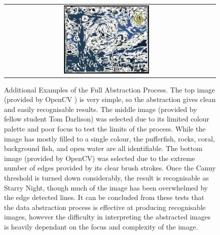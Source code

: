\begin{figure}[ht]
\begin{center}
\begin{tabular}{ c c }
        \includegraphics[width=0.43\textwidth]{Figures/starry_nightDA.jpg} 
    \end{tabular}
    \caption[Additional Examples of the Full Abstraction Process]{Additional Examples of the Full Abstraction Process. The top image (provided by OpenCV \cite{OpenCV}) is very simple, so the abstraction gives clean and easily recognisable results. The middle image (provided by fellow student Tom Darlison) was selected due to its limited colour palette and poor focus to test the limits of the process. While the image has mostly filled to a single colour, the pufferfish, rocks, coral, background fish, and open water are all identifiable. The bottom image (provided by OpenCV) was selected due to the extreme number of edges provided by its clear brush strokes. Once the Canny threshold is turned down considerably, the result is recognisable as Starry Night, though much of the image has been overwhelmed by the edge detected lines. It can be concluded from these tests that the data abstraction process is effective at producing recognisable images, however the difficulty in interpreting the abstracted images is heavily dependant on the focus and complexity of the image.}
    \label{fig:FinalExtras}
    \end{center}
\end{figure}